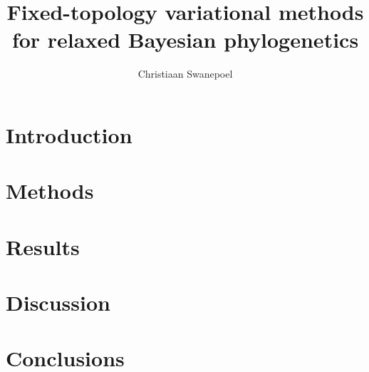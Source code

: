 \documentclass{article}
\title{Fixed-topology variational methods for relaxed Bayesian phylogenetics}
\author{Christiaan Swanepoel}
\begin{document}
\maketitle
\section*{Introduction}

\section*{Methods}

\section*{Results}


\section*{Discussion}

\section*{Conclusions}
\end{document}
